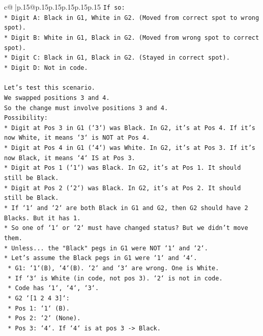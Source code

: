 \documentclass{article}
\begin{document}
{\begin{supertabular}{c@{$\;$}|p{.15\linewidth}@{}p{.15\linewidth}p{.15\linewidth}p{.15\linewidth}p{.15\linewidth}p{.15\linewidth}}
{{{\texttt{If so:} \\
\texttt{*   Digit A: Black in G1, White in G2. (Moved from correct spot to wrong spot).} \\
\texttt{*   Digit B: White in G1, Black in G2. (Moved from wrong spot to correct spot).} \\
\texttt{*   Digit C: Black in G1, Black in G2. (Stayed in correct spot).} \\
\texttt{*   Digit D: Not in code.} \\
\\ 
\texttt{Let's test this scenario.} \\
\texttt{We swapped positions 3 and 4.} \\
\texttt{So the change must involve positions 3 and 4.} \\
\texttt{Possibility:} \\
\texttt{*   Digit at Pos 3 in G1 (`3`) was Black. In G2, it's at Pos 4. If it's now White, it means `3` is NOT at Pos 4.} \\
\texttt{*   Digit at Pos 4 in G1 (`4`) was White. In G2, it's at Pos 3. If it's now Black, it means `4` IS at Pos 3.} \\
\texttt{*   Digit at Pos 1 (`1`) was Black. In G2, it's at Pos 1. It should still be Black.} \\
\texttt{*   Digit at Pos 2 (`2`) was Black. In G2, it's at Pos 2. It should still be Black.} \\
\texttt{*   If `1` and `2` are both Black in G1 and G2, then G2 should have 2 Blacks. But it has 1.} \\
\texttt{*   So one of `1` or `2` must have changed status? But we didn't move them.} \\
\texttt{*   Unless... the "Black" pegs in G1 were NOT `1` and `2`.} \\
\texttt{*   Let's assume the Black pegs in G1 were `1` and `4`.} \\
\texttt{    *   G1: `1`(B), `4`(B). `2` and `3` are wrong. One is White.} \\
\texttt{    *   If `3` is White (in code, not pos 3). `2` is not in code.} \\
\texttt{    *   Code has `1`, `4`, `3`.} \\
\texttt{    *   G2 `{[}1 2 4 3{]}`:} \\
\texttt{        *   Pos 1: `1` (B).} \\
\texttt{        *   Pos 2: `2` (None).} \\
\texttt{        *   Pos 3: `4`. If `4` is at pos 3 {-}> Black.} \\
}}}
\end{supertabular}}
\end{document}
